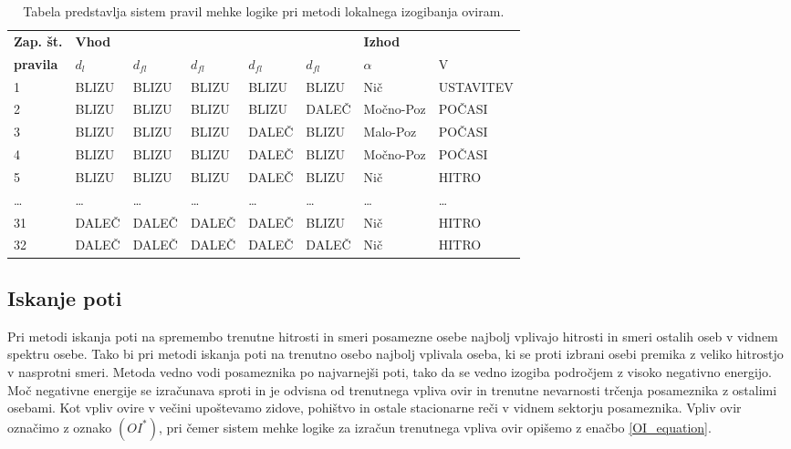 \documentclass[9pt]{pnas-new}
\begin{document}
\begin{table}[]
\centering
\begin{tabular}{|l|lllll|ll|}
\hline
\textbf{Zap. št.} & \multicolumn{5}{l|}{\textbf{Vhod}} & \multicolumn{2}{l|}{\textbf{Izhod}} \\ 
\cline{2-8} 
\textbf{pravila} & ${d_l}$ & ${d_{fl}}$ & ${d_{fl}}$ & ${d_{fl}}$ & ${d_{fl}}$ & ${\alpha}$ & V \\ 
\hline
1   & BLIZU & BLIZU & BLIZU & BLIZU & BLIZU & Nič           & USTAVITEV  \\ \hline
2   & BLIZU & BLIZU & BLIZU & BLIZU & DALEČ & Močno-Poz     & POČASI     \\ \hline
3   & BLIZU & BLIZU & BLIZU & DALEČ & BLIZU & Malo-Poz      & POČASI     \\ \hline
4   & BLIZU & BLIZU & BLIZU & DALEČ & BLIZU & Močno-Poz     & POČASI     \\ \hline
5   & BLIZU & BLIZU & BLIZU & DALEČ & BLIZU & Nič           & HITRO      \\ \hline
\dots & \dots  & \dots  & \dots  & \dots  & \dots  & \dots  & \dots      \\ \hline
31  & DALEČ & DALEČ & DALEČ & DALEČ & BLIZU & Nič           & HITRO      \\ \hline
32  & DALEČ & DALEČ & DALEČ & DALEČ & DALEČ & Nič           & HITRO      \\ \hline
\end{tabular}
\caption{Tabela predstavlja sistem pravil mehke logike pri metodi lokalnega izogibanja oviram.}
\label{rules_obstacle_avoidance_behaviour}
\end{table}

\subsection*{Iskanje poti}
\label{iskanje_poti}
Pri metodi iskanja poti na spremembo trenutne hitrosti in smeri posamezne osebe najbolj vplivajo hitrosti in smeri ostalih oseb v vidnem spektru osebe. Tako bi pri metodi iskanja poti na trenutno osebo najbolj vplivala oseba, ki se proti izbrani osebi premika z veliko hitrostjo v nasprotni smeri. Metoda vedno vodi posameznika po najvarnejši poti, tako da se vedno izogiba področjem z visoko negativno energijo. Moč negativne energije se izračunava sproti in je odvisna od trenutnega vpliva ovir in trenutne nevarnosti trčenja posameznika z ostalimi osebami. Kot vpliv ovire v večini upoštevamo zidove, pohištvo in ostale stacionarne reči v vidnem sektorju posameznika. Vpliv ovir označimo z oznako ${(OI^*)}$, pri čemer sistem mehke logike za izračun trenutnega vpliva ovir opišemo z enačbo \ref{OI_equation}.
\end{document}
